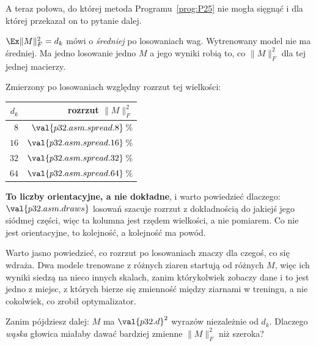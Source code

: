 \begin{fr}
A teraz połowa, do której metoda Programu~\ref{prog:P25} nie mogła sięgnąć i
dla której przekazał on to pytanie dalej.

$\Ex\lVert M\rVert_F^{2} = d_k$ mówi o \emph{średniej} po losowaniach wag.
Wytrenowany model nie ma średniej. Ma jedno losowanie \dash{} jedno $M$
\dash{} a jego wyniki robią to, co $\lVert M\rVert_F^{2}$ dla tej jednej
macierzy.

Zmierzony po losowaniach względny rozrzut tej wielkości:

\begin{center}
\begin{tabular}{rr}
\toprule
$d_k$ & rozrzut $\lVert M\rVert_F^{2}$ \\
\midrule
$8$  & $\val{p32.asm.spread.8}$\,\% \\
$16$ & $\val{p32.asm.spread.16}$\,\% \\
$32$ & $\val{p32.asm.spread.32}$\,\% \\
$64$ & $\val{p32.asm.spread.64}$\,\% \\
\bottomrule
\end{tabular}
\end{center}

\textbf{To liczby orientacyjne, a nie dokładne}, i warto powiedzieć dlaczego:
$\val{p32.asm.draws}$ losowań szacuje rozrzut z dokładnością do jakiejś jego
siódmej części, więc ta kolumna jest rzędem wielkości, a nie pomiarem. Co nie
jest orientacyjne, to kolejność, a kolejność ma powód.

Warto jasno powiedzieć, co rozrzut po losowaniach znaczy dla czegoś, co się
wdraża. Dwa modele trenowane z różnych ziaren startują od różnych $M$, więc
ich wyniki siedzą na nieco innych skalach, zanim którykolwiek zobaczy
dane \dash{} i to jest jedno z miejsc, z których bierze się zmienność między
ziarnami w treningu, a nie cokolwiek, co zrobił optymalizator.

Zanim pójdziesz dalej: $M$ ma $\val{p32.d}^{2}$ wyrazów niezależnie od $d_k$.
Dlaczego \emph{wąska} głowica miałaby dawać bardziej zmienne
$\lVert M\rVert_F^{2}$ niż szeroka?
\dotline
\nextframe
\end{fr}

